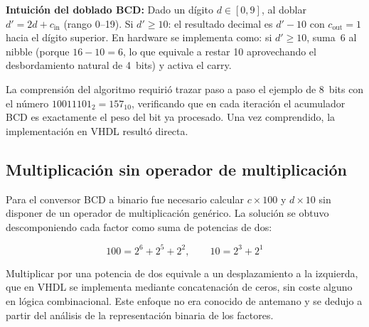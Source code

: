 \documentclass[memoria_final]{subfiles}
\begin{document}
	\begin{tcolorbox}[colback=SoftOrange, colframe=MainOrange, boxrule=0.8pt, arc=2pt,
		left=0.5cm, right=0.5cm, top=0.3cm, bottom=0.3cm]
		\small\faLightbulb\enspace\textbf{Intuición del doblado BCD:}
		Dado un dígito $d \in [0,9]$, al doblar $d' = 2d + c_{\text{in}}$ (rango 0--19).
		Si $d' \geq 10$: el resultado decimal es $d'-10$ con $c_{\text{out}}=1$ hacia el
		dígito superior. En hardware se implementa como: si $d' \geq 10$, suma~6 al nibble
		(porque $16 - 10 = 6$, lo que equivale a restar 10 aprovechando el desbordamiento
		natural de 4~bits) y activa el carry.
	\end{tcolorbox}

	La comprensión del algoritmo requirió trazar paso a paso el ejemplo de 8~bits con
	el número $10011101_2 = 157_{10}$, verificando que en cada iteración el acumulador
	BCD es exactamente el peso del bit ya procesado. Una vez comprendido, la
	implementación en VHDL resultó directa.

	\subsection{Multiplicación sin operador de multiplicación}

	Para el conversor BCD a binario fue necesario calcular $c \times 100$ y $d \times 10$ sin disponer de un operador de multiplicación genérico. La solución se obtuvo descomponiendo cada factor como suma de potencias de dos:

	$$100 = 2^6 + 2^5 + 2^2, \qquad 10 = 2^3 + 2^1$$

	Multiplicar por una potencia de dos equivale a un desplazamiento a la izquierda, que en VHDL se implementa mediante concatenación de ceros, sin coste alguno en lógica combinacional. Este enfoque no era conocido de antemano y se dedujo a partir del análisis de la representación binaria de los factores.
\end{document}
